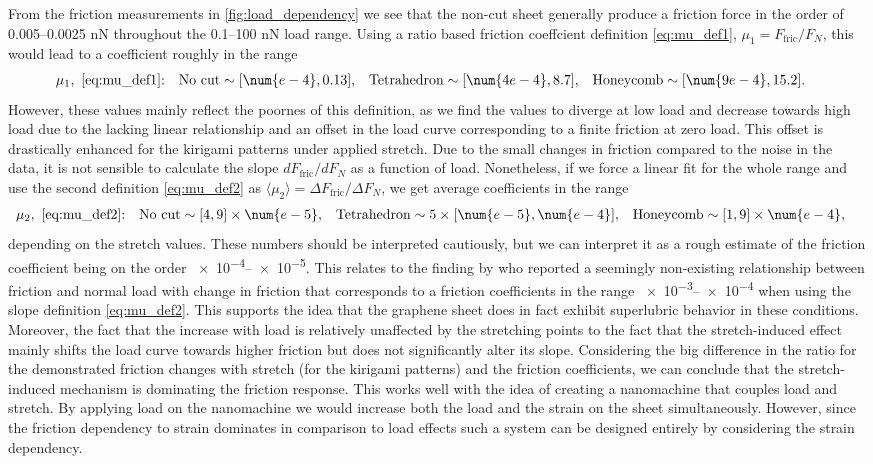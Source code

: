 From the friction measurements in \cref{fig:load_dependency} we see that the
non-cut sheet generally produce a friction force in the order of 0.005--0.0025
nN throughout the 0.1--100 nN load range. Using a ratio based friction coeffcient definition
\cref{eq:mu_def1}, $\mu_1 = F_{\text{fric}}/{F_N}$, this would lead to a coefficient roughly in the range
\begin{align*}
  &\mu_1,  \ \text{\cref{eq:mu_def1}:}& &\text{No cut}\sim [\num{e-4}, 0.13],&  &\text{Tetrahedron}\sim [\num{4e-4},8.7],& &\text{Honeycomb}\sim [\num{9e-4}, 15.2].&
\end{align*}
However, these values mainly reflect the
poornes of this definition, as we find the values to diverge at low load and decrease towards high load due to the lacking linear relationship and an offset in the load curve corresponding to a finite friction at zero load. This offset is drastically enhanced for the kirigami patterns under applied stretch. Due to the small changes in friction compared to the noise in the data, it is not sensible to calculate the slope $dF_{\text{fric}}/dF_N$ as a function of load. Nonetheless, if we force a linear fit for the whole range and use the second definition \cref{eq:mu_def2} as $\langle \mu_2 \rangle = \Delta F_{\text{fric}}/\Delta F_N$, we get average coefficients in the range
\begin{align*}
  &\mu_2,  \ \text{\cref{eq:mu_def2}:}& &\text{No cut} \sim [4, 9]\times \num{e-5},&  &\text{Tetrahedron} \sim 5\times[\num{e-5}, \num{e-4}],& &\text{Honeycomb} \sim [1,9]\times \num{e-4},&
\end{align*}
depending on the stretch values. These numbers should be interpreted cautiously,
but we can interpret it as a rough estimate of the friction coefficient being on
the order \num{e-4}--\num{e-5}. This relates to the finding by
\cite{DIENWIEBEL2005197} who reported a seemingly non-existing relationship
between friction and normal load with change in friction that corresponds to a friction coefficients in the range \num{e-3}--\num{e-4} when using the slope definition \cref{eq:mu_def2}. This supports the idea that the graphene sheet does in fact exhibit superlubric behavior in these conditions. Moreover, the fact that the increase with load is relatively unaffected by the stretching points to the fact that the stretch-induced effect mainly shifts the load curve towards higher friction but does not significantly alter its slope. Considering the big difference
in the ratio for the demonstrated friction changes with stretch (for the
kirigami patterns) and the friction coefficients, we can conclude that the stretch-induced mechanism is dominating the friction response. This works well with the idea of creating a nanomachine that couples load and stretch. By applying load on the nanomachine we would increase both the load and the strain on the sheet simultaneously. However, since the friction dependency to strain dominates in comparison to load effects such a system can be designed entirely by considering the strain dependency.






